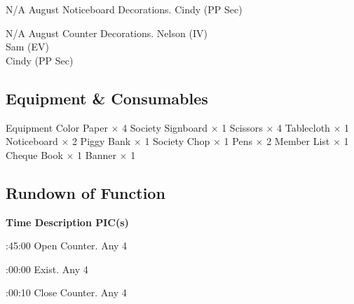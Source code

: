 \bTR\bTD N/A
\eTD{} August
\eTD\bTD Noticeboard Decorations.
\eTD\bTD Cindy (PP Sec)
\eTD\eTR

\bTR\bTD N/A
\eTD{} August
\eTD\bTD Counter Decorations.
\eTD\bTD Nelson (IV) \\ Sam (EV) \\ Cindy (PP Sec)
\eTD\eTR

\eTABLEbody
\eTABLE

\subsection{Equipment \& Consumables}
\starttabulate[|l|l|]
\NC{}Equipment\NC\NR
\HL
\NC Color Paper \NC $\times$ 4 \NR
\NC Society Signboard \NC $\times$ 1 \NR
\NC Scissors \NC $\times$ 4 \NR
\NC Tablecloth \NC $\times$ 1 \NR
\NC Noticeboard \NC $\times$ 2 \NR
\NC Piggy Bank \NC $\times$ 1 \NR
\NC Society Chop \NC $\times$ 1 \NR
\NC Pens \NC $\times$ 2 \NR
\NC Member List \NC $\times$ 1 \NR
\NC Cheque Book \NC $\times$ 1 \NR
\NC Banner \NC $\times$ 1 \NR
\HL
\stoptabulate

\subsection{Rundown of Function}

\setupTABLE[c][1][width=1.25in]
\setupTABLE[c][2][width=3.5in]
\setupTABLE[c][3][width=1.25in]
\bTABLE
\bTABLEhead

\bTR\bTH    \bf{Time}
\eTH\bTH    \bf{Description}
\eTH\bTH    \bf{PIC(s)}
\eTH\eTR

\eTABLEhead
\bTABLEbody

\bTR{}:45:00
\eTD\bTD Open Counter.
\eTD\bTD Any 4
\eTD\eTR

\bTR{}:00:00
\eTD\bTD Exist.
\eTD\bTD Any 4
\eTD\eTR

\bTR{}:00:10
\eTD\bTD Close Counter.
\eTD\bTD Any 4
\eTD\eTR

\eTABLEbody
\eTABLE

\pagebreak
